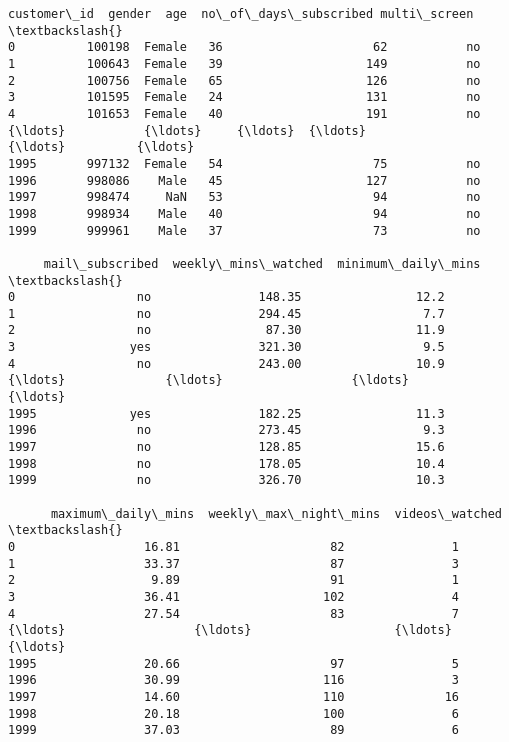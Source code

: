 \documentclass[11pt]{article}
\makeatletter
\newcommand{\boxspacing}{\kern\kvtcb@left@rule\kern\kvtcb@boxsep}
\newcommand{\prompt}[4]{
        {\ttfamily\llap{{\color{#2}[#3]:\hspace{3pt}#4}}\vspace{-\baselineskip}}
    }
\makeatother
\begin{document}
            \begin{tcolorbox}[breakable, size=fbox, boxrule=.5pt, pad at break*=1mm, opacityfill=0]
\prompt{Out}{outcolor}{25}{\boxspacing}
\begin{Verbatim}[commandchars=\\\{\}]
      customer\_id  gender  age  no\_of\_days\_subscribed multi\_screen  \textbackslash{}
0          100198  Female   36                     62           no
1          100643  Female   39                    149           no
2          100756  Female   65                    126           no
3          101595  Female   24                    131           no
4          101653  Female   40                    191           no
{\ldots}           {\ldots}     {\ldots}  {\ldots}                    {\ldots}          {\ldots}
1995       997132  Female   54                     75           no
1996       998086    Male   45                    127           no
1997       998474     NaN   53                     94           no
1998       998934    Male   40                     94           no
1999       999961    Male   37                     73           no

     mail\_subscribed  weekly\_mins\_watched  minimum\_daily\_mins  \textbackslash{}
0                 no               148.35                12.2
1                 no               294.45                 7.7
2                 no                87.30                11.9
3                yes               321.30                 9.5
4                 no               243.00                10.9
{\ldots}              {\ldots}                  {\ldots}                 {\ldots}
1995             yes               182.25                11.3
1996              no               273.45                 9.3
1997              no               128.85                15.6
1998              no               178.05                10.4
1999              no               326.70                10.3

      maximum\_daily\_mins  weekly\_max\_night\_mins  videos\_watched  \textbackslash{}
0                  16.81                     82               1
1                  33.37                     87               3
2                   9.89                     91               1
3                  36.41                    102               4
4                  27.54                     83               7
{\ldots}                  {\ldots}                    {\ldots}             {\ldots}
1995               20.66                     97               5
1996               30.99                    116               3
1997               14.60                    110              16
1998               20.18                    100               6
1999               37.03                     89               6


\end{Verbatim}
\end{tcolorbox}
\end{document}
